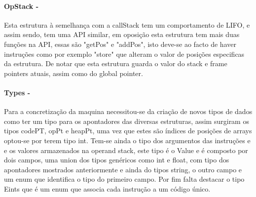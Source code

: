 \documentclass{report}
\begin{document}
\paragraph{\quad OpStack - } Esta estrutura à semelhança com a callStack tem um comportamento de LIFO, e assim sendo,
 tem uma API similar, em oposição esta estrutura tem mais duas funções na API, essas são "getPos" e "addPos",
 isto deve-se ao facto de haver instruções como por exemplo "store" que alteram o valor de posições  especificas
 da estrutura. De notar que esta estrutura guarda o valor do stack e frame pointers atuais, assim como do global pointer.

\noindent
\par
\begin{Parallel}[v]{0.48\textwidth}{0.48\textwidth}
\ParallelPar
\end{Parallel}

\paragraph{\quad Types - } Para a concretização da maquina necessitou-se da criação de novos tipos de dados como ter
 um tipo para os apontadores das diversas estruturas, assim surgiram os tipos codePT, opPt e heapPt, uma
	vez que estes são índices de posições de arrays optou-se por terem tipo int. Tem-se ainda o tipo dos
	 argumentos das instruções e e os valores armazenados na operand stack, este tipo é o Value e é composto
		por dois campos, uma union dos tipos genéricos como int e float, com tipo dos apontadores mostrados
		 anteriormente e ainda do tipos string, o outro campo e um enum que identifica o tipo do primeiro campo.
		 Por fim falta destacar o tipo Eints que é um enum que associa cada instrução a um código único.
\end{document}
